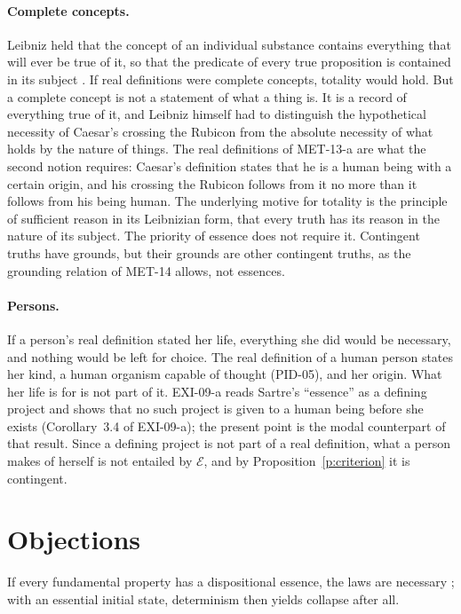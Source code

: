 \documentclass{situationist-preprint}
\begin{document}
\paragraph{Complete concepts.} Leibniz held that the concept of an individual substance contains everything that will ever be true of it, so that the predicate of every true proposition is contained in its subject \citep[§§8, 13]{Leibniz1686}. If real definitions were complete concepts, totality would hold. But a complete concept is not a statement of what a thing is. It is a record of everything true of it, and Leibniz himself had to distinguish the hypothetical necessity of Caesar's crossing the Rubicon from the absolute necessity of what holds by the nature of things. The real definitions of MET-13-a are what the second notion requires: Caesar's definition states that he is a human being with a certain origin, and his crossing the Rubicon follows from it no more than it follows from his being human. The underlying motive for totality is the principle of sufficient reason in its Leibnizian form, that every truth has its reason in the nature of its subject. The priority of essence does not require it. Contingent truths have grounds, but their grounds are other contingent truths, as the grounding relation of MET-14 allows, not essences.

\paragraph{Persons.} If a person's real definition stated her life, everything she did would be necessary, and nothing would be left for choice. The real definition of a human person states her kind, a human organism capable of thought (PID-05), and her origin. What her life is for is not part of it. EXI-09-a reads Sartre's \enquote{essence} as a defining project and shows that no such project is given to a human being before she exists (Corollary~3.4 of EXI-09-a); the present point is the modal counterpart of that result. Since a defining project is not part of a real definition, what a person makes of herself is not entailed by $\mathcal{E}$, and by Proposition~\ref{p:criterion} it is contingent.

\section{Objections}\label{s:objections}

\begin{objection}
If every fundamental property has a dispositional essence, the laws are necessary \citep{Bird2007}; with an essential initial state, determinism then yields collapse after all.
\end{objection}
\end{document}
